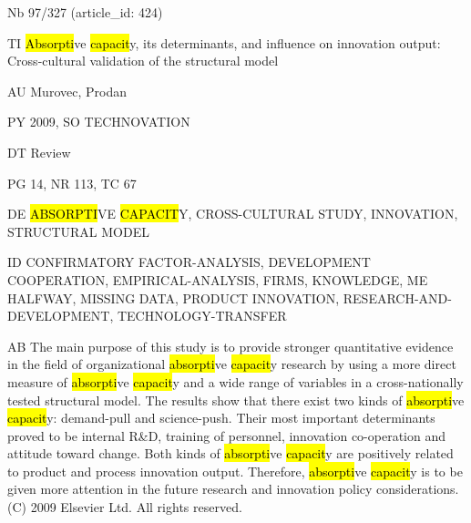 \documentclass[a4paper]{article}
\begin{document}
\vspace*{-2cm}
Nb \tabto{0cm}97/327 (article\_id: 424)\par
TI \tabto{0cm}\hl{Absorpti}ve \hl{capacit}y, its determinants, and influence on innovation output: Cross-cultural validation of the structural model\par
AU \tabto{0cm}Murovec, Prodan\par
PY \tabto{0cm}2009, SO TECHNOVATION\par
DT \tabto{0cm}Review\par
PG \tabto{0cm}14, NR 113, TC 67\par
DE \tabto{0cm}\hl{ABSORPTI}VE \hl{CAPACIT}Y, CROSS-CULTURAL STUDY, INNOVATION, STRUCTURAL MODEL\par
ID \tabto{0cm}CONFIRMATORY FACTOR-ANALYSIS, DEVELOPMENT COOPERATION, EMPIRICAL-ANALYSIS, FIRMS, KNOWLEDGE, ME HALFWAY, MISSING DATA, PRODUCT INNOVATION, RESEARCH-AND-DEVELOPMENT, TECHNOLOGY-TRANSFER\par
AB \tabto{0cm}The main purpose of this study is to provide stronger quantitative evidence in the field of organizational \hl{absorpti}ve \hl{capacit}y research by using a more direct measure of \hl{absorpti}ve \hl{capacit}y and a wide range of variables in a cross-nationally tested structural model. The results show that there exist two kinds of \hl{absorpti}ve \hl{capacit}y: demand-pull and science-push. Their most important determinants proved to be internal R\&D, training of personnel, innovation co-operation and attitude toward change. Both kinds of \hl{absorpti}ve \hl{capacit}y are positively related to product and process innovation output. Therefore, \hl{absorpti}ve \hl{capacit}y is to be given more attention in the future research and innovation policy considerations. (C) 2009 Elsevier Ltd. All rights reserved.\par
\clearpage
\end{document}
